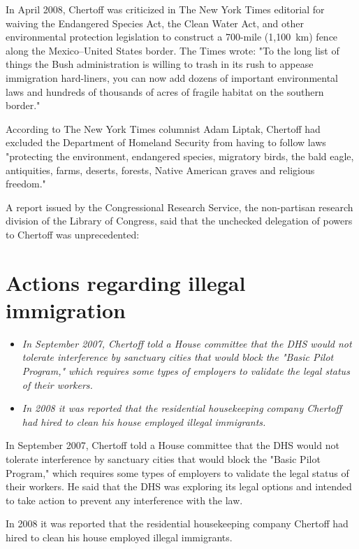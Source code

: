 In April 2008, Chertoff was criticized in The New York Times editorial
for waiving the Endangered Species Act, the Clean Water Act, and other
environmental protection legislation to construct a 700-mile (1,100~km)
fence along the Mexico--United States border. The Times wrote: "To the
long list of things the Bush administration is willing to trash in its
rush to appease immigration hard-liners, you can now add dozens of
important environmental laws and hundreds of thousands of acres of
fragile habitat on the southern border."

According to The New York Times columnist Adam Liptak, Chertoff had
excluded the Department of Homeland Security from having to follow laws
"protecting the environment, endangered species, migratory birds, the
bald eagle, antiquities, farms, deserts, forests, Native American graves
and religious freedom."

A report issued by the Congressional Research Service, the non-partisan
research division of the Library of Congress, said that the unchecked
delegation of powers to Chertoff was unprecedented:

\section{Actions regarding illegal
immigration}\label{actions-regarding-illegal-immigration}

\begin{itemize}
\item
  \emph{In September 2007, Chertoff told a House committee that the DHS
  would not tolerate interference by sanctuary cities that would block
  the "Basic Pilot Program," which requires some types of employers to
  validate the legal status of their workers.}
\item
  \emph{In 2008 it was reported that the residential housekeeping
  company Chertoff had hired to clean his house employed illegal
  immigrants.}
\end{itemize}

In September 2007, Chertoff told a House committee that the DHS would
not tolerate interference by sanctuary cities that would block the
"Basic Pilot Program," which requires some types of employers to
validate the legal status of their workers. He said that the DHS was
exploring its legal options and intended to take action to prevent any
interference with the law.

In 2008 it was reported that the residential housekeeping company
Chertoff had hired to clean his house employed illegal immigrants.

